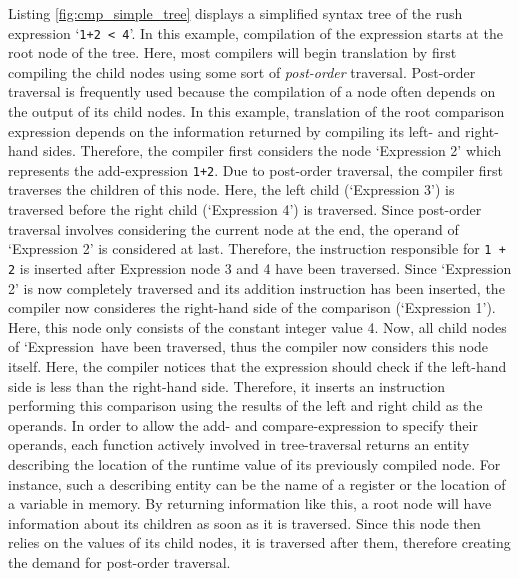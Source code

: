Listing \ref{fig:cmp_simple_tree} displays a simplified syntax tree of the rush expression `\texttt{1+2 < 4}'.
In this example, compilation of the expression starts at the root node of the tree.
Here, most compilers will begin translation by first compiling the child nodes using some sort of \emph{post-order} traversal.
Post-order traversal is frequently used because the compilation of a node often depends on the output of its child nodes.
In this example, translation of the root comparison expression depends on the information returned by compiling its left- and right-hand sides.
Therefore, the compiler first considers the node `Expression 2' which represents the add-expression \texttt{1+2}.
Due to post-order traversal, the compiler first traverses the children of this node.
Here, the left child (`Expression 3') is traversed before the right child (`Expression 4') is traversed.
Since post-order traversal involves considering the current node at the end, the operand of `Expression 2' is considered at last.
Therefore, the instruction responsible for \texttt{1 + 2} is inserted after Expression node 3 and 4 have been traversed.
Since `Expression 2' is now completely traversed and its addition instruction has been inserted, the compiler now consideres the right-hand side of the comparison (`Expression 1').
Here, this node only consists of the constant integer value 4.
Now, all child nodes of `Expression\ have been traversed, thus the compiler now considers this node itself.
Here, the compiler notices that the expression should check if the left-hand side is less than the right-hand side.
Therefore, it inserts an instruction performing this comparison using the results of the left and right child as the operands.
In order to allow the add- and compare-expression to specify their operands,
each function actively involved in tree-traversal returns an entity describing the location of the runtime value of its previously compiled node.
For instance, such a describing entity can be the name of a register or the location of a variable in memory.
By returning information like this, a root node will have information about its children as soon as it is traversed.
Since this node then relies on the values of its child nodes, it is traversed after them, therefore creating the demand for post-order traversal.


